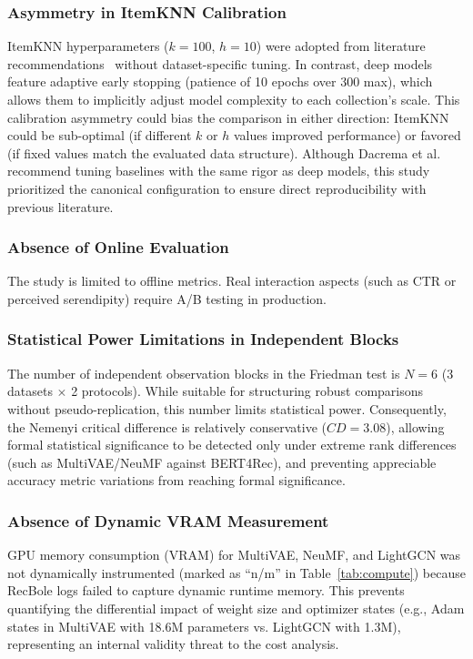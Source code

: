 \documentclass[journal]{IEEEtran}
\begin{document}
\subsubsection{Asymmetry in ItemKNN Calibration}
\label{subsec:itemknn-tuning}
ItemKNN hyperparameters ($k=100$, $h=10$) were adopted from literature recommendations~\cite{sarwar2001item} without dataset-specific tuning. In contrast, deep models feature adaptive early stopping (patience of 10 epochs over 300 max), which allows them to implicitly adjust model complexity to each collection's scale. This calibration asymmetry could bias the comparison in either direction: ItemKNN could be sub-optimal (if different $k$ or $h$ values improved performance) or favored (if fixed values match the evaluated data structure). Although Dacrema et al.~\cite{dacrema2019really} recommend tuning baselines with the same rigor as deep models, this study prioritized the canonical configuration to ensure direct reproducibility with previous literature.

\subsubsection{Absence of Online Evaluation}
The study is limited to offline metrics. Real interaction aspects (such as CTR or perceived serendipity) require A/B testing in production.

\subsubsection{Statistical Power Limitations in Independent Blocks}
The number of independent observation blocks in the Friedman test is $N=6$ (3 datasets $\times$ 2 protocols). While suitable for structuring robust comparisons without pseudo-replication, this number limits statistical power. Consequently, the Nemenyi critical difference is relatively conservative ($CD = 3.08$), allowing formal statistical significance to be detected only under extreme rank differences (such as MultiVAE/NeuMF against BERT4Rec), and preventing appreciable accuracy metric variations from reaching formal significance.

\subsubsection{Absence of Dynamic VRAM Measurement}
GPU memory consumption (VRAM) for MultiVAE, NeuMF, and LightGCN was not dynamically instrumented (marked as ``n/m'' in Table~\ref{tab:compute}) because RecBole logs failed to capture dynamic runtime memory. This prevents quantifying the differential impact of weight size and optimizer states (e.g., Adam states in MultiVAE with 18.6M parameters vs. LightGCN with 1.3M), representing an internal validity threat to the cost analysis.
\end{document}
